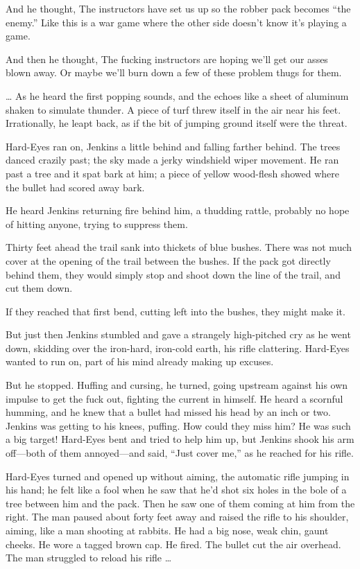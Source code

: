 And he thought, The instructors have set us up so the robber pack becomes “the enemy.” Like this is a war game where the other side doesn’t know it’s playing a game.

And then he thought, The fucking instructors are hoping we’ll get our asses blown away. Or maybe we’ll burn down a few of these problem thugs for them.

… As he heard the first popping sounds, and the echoes like a sheet of aluminum shaken to simulate thunder. A piece of turf threw itself in the air near his feet. Irrationally, he leapt back, as if the bit of jumping ground itself were the threat.

Hard-Eyes ran on, Jenkins a little behind and falling farther behind. The trees danced crazily past; the sky made a jerky windshield wiper movement. He ran past a tree and it spat bark at him; a piece of yellow wood-flesh showed where the bullet had scored away bark.

He heard Jenkins returning fire behind him, a thudding rattle, probably no hope of hitting anyone, trying to suppress them.

Thirty feet ahead the trail sank into thickets of blue bushes. There was not much cover at the opening of the trail between the bushes. If the pack got directly behind them, they would simply stop and shoot down the line of the trail, and cut them down.

If they reached that first bend, cutting left into the bushes, they might make it.

But just then Jenkins stumbled and gave a strangely high-pitched cry as he went down, skidding over the iron-hard, iron-cold earth, his rifle clattering. Hard-Eyes wanted to run on, part of his mind already making up excuses.

But he stopped. Huffing and cursing, he turned, going upstream against his own impulse to get the fuck out, fighting the current in himself. He heard a scornful humming, and he knew that a bullet had missed his head by an inch or two. Jenkins was getting to his knees, puffing. How could they miss him? He was such a big target! Hard-Eyes bent and tried to help him up, but Jenkins shook his arm off—both of them annoyed—and said, “Just cover me,” as he reached for his rifle.

Hard-Eyes turned and opened up without aiming, the automatic rifle jumping in his hand; he felt like a fool when he saw that he’d shot six holes in the bole of a tree between him and the pack. Then he saw one of them coming at him from the right. The man paused about forty feet away and raised the rifle to his shoulder, aiming, like a man shooting at rabbits. He had a big nose, weak chin, gaunt cheeks. He wore a tagged brown cap. He fired. The bullet cut the air overhead. The man struggled to reload his rifle …

